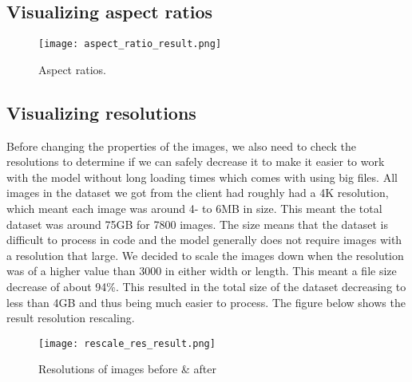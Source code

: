 \newpage
\subsection{Visualizing aspect ratios}

\begin{figure}[H] %
	\texttt{[image: aspect\_ratio\_result.png]}
	\caption{Aspect ratios.}
	\label{fig:aspect_ratio_result} %
\end{figure}

\newpage
\subsection{Visualizing resolutions}
\begin{fullwidth} %
Before changing the properties of the images, 
we also need to check the resolutions to determine if we can safely decrease it to make it easier to work with the model without long loading times which comes with using big files. 
All images in the dataset we got from the client had roughly had a 4K resolution, which meant each image was around 4- to 6MB in size. 
This meant the total dataset was around 75GB for 7800 images. 
The size means that the dataset is difficult to process in code and the model generally does not require images with a resolution that large. 
We decided to scale the images down when the resolution was of a higher value than 3000 in either width or length. 
This meant a file size decrease of about 94\%. 
This resulted in the total size of the dataset decreasing to less than 4GB and thus being much easier to process. 
The figure below shows the result resolution rescaling.
\end{fullwidth} %

\begin{figure}[H] %
	\texttt{[image: rescale\_res\_result.png]}
	\caption{Resolutions of images before \& after}
	\label{fig:rescale_res_result} %
\end{figure}

